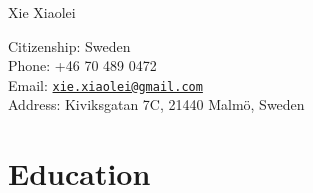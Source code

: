 \documentclass[10pt,letterpaper]{article}
\def\name{Xie Xiaolei}
\begin{document}
{\huge Xie Xiaolei}


\vspace{0.25in}

\begin{minipage}[t]{0.5\textwidth}
  Citizenship: Sweden \\
  Phone: +46 70 489 0472 \\
  Email: \href{mailto:xie.xiaolei@gmail.com}{\tt xie.xiaolei@gmail.com} \\
  Address: Kiviksgatan 7C, 21440 Malm\"{o}, Sweden
\end{minipage}

\section*{Education}
\end{document}
